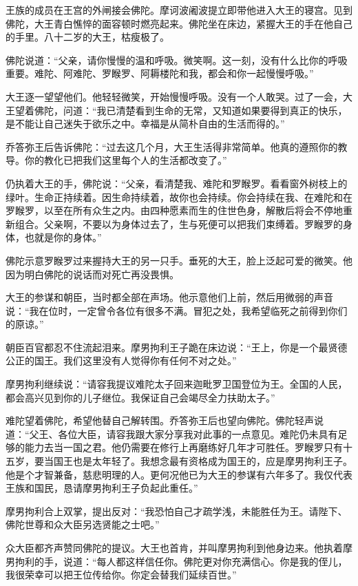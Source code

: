 \documentclass[12pt,twoside,openany]{book}
\begin{document}
王族的成员在王宫的外闸接会佛陀。摩诃波阇波提立即带他进入大王的寝宫。见到佛陀，大王青白憔悴的面容顿时燃亮起来。佛陀坐在床边，紧握大王的手在他自己的手里。八十二岁的大王，枯瘦极了。

佛陀说道：“父亲，请你慢慢的温和呼吸。微笑啊。这一刻，没有什么比你的呼吸重要。难陀、阿难陀、罗睺罗、阿耨楼陀和我，都会和你一起慢慢呼吸。”

大王逐一望望他们。他轻轻微笑，开始慢慢呼吸。没有一个人敢哭。过了一会，大王望着佛陀，问道：“我已清楚看到生命的无常，又知道如果要得到真正的快乐，是不能让自己迷失于欲乐之中。幸福是从简朴自由的生活而得的。”

乔答弥王后告诉佛陀：“过去这几个月，大王生活得非常简单。他真的遵照你的教导。你的教化已把我们这里每个人的生活都改变了。”

仍执着大王的手，佛陀说：“父亲，看清楚我、难陀和罗睺罗。看看窗外树枝上的绿叶。生命正持续着。因生命持续着，故你也会持续。你会持续在我、在难陀和在罗睺罗，以至在所有众生之内。由四种愿素而生的住世色身，解散后将会不停地重新组合。父亲啊，不要以为身体过去了，生与死便可以把我们束缚着。罗睺罗的身体，也就是你的身体。”

佛陀示意罗睺罗过来握持大王的另一只手。垂死的大王，脸上泛起可爱的微笑。他因为明白佛陀的说话而对死亡再没畏惧。

大王的参谋和朝臣，当时都全部在声场。他示意他们上前，然后用微弱的声音说：“我在位时，一定曾令各位有很多不满。冒犯之处，我希望临死之前得到你们的原谅。”

朝臣百官都忍不住流起泪来。摩男拘利王子跪在床边说：“王上，你是一个最贤德公正的国王。我们这里没有人觉得你有任何不对之处。”

摩男拘利继续说：“请容我提议难陀太子回来迦毗罗卫国登位为王。全国的人民，都会高兴见到你的儿子继位。我保证自己会竭尽全力扶助太子。”

难陀望着佛陀，希望他替自己解转围。乔答弥王后也望向佛陀。佛陀轻声说道：“父王、各位大臣，请容我跟大家分享我对此事的一点意见。难陀仍未具有足够的能力去当一国之君。他仍需要在修行上再磨练好几年才可胜任。罗睺罗只有十五岁，要当国王也是太年轻了。我想念最有资格成为国王的，应是摩男拘利王子。他是个才智兼备，慈悲明理的人。更何况他已为大王的参谋有六年多了。我仅代表王族和国民，恳请摩男拘利王子负起此重任。”

摩男拘利合上双掌，提出反对：“我恐怕自己才疏学浅，未能胜任为王。请陛下、佛陀世尊和众大臣另选贤能之士吧。”

众大臣都齐声赞同佛陀的提议。大王也首肯，并叫摩男拘利到他身边来。他执着摩男拘利的手，说道：“每人都这样信任你。佛陀更对你充满信心。你是我的侄儿，我很荣幸可以把王位传给你。你定会替我们延续百世。”
\end{document}
